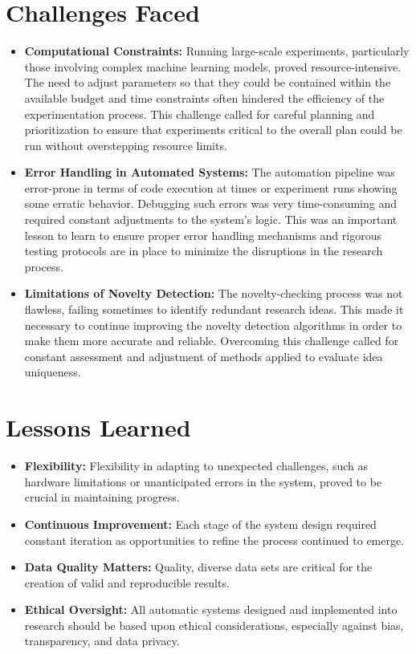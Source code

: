 \section{Challenges Faced}
\begin{itemize}
    \item \textbf{Computational Constraints:} Running large-scale experiments, particularly those involving complex machine learning models, proved resource-intensive. The need to adjust parameters so that they could be contained within the available budget and time constraints often hindered the efficiency of the experimentation process. This challenge called for careful planning and prioritization to ensure that experiments critical to the overall plan could be run without overstepping resource limits.
    
    \item \textbf{Error Handling in Automated Systems:} The automation pipeline was error-prone in terms of code execution at times or experiment runs showing some erratic behavior. Debugging such errors was very time-consuming and required constant adjustments to the system's logic. This was an important lesson to learn to ensure proper error handling mechanisms and rigorous testing protocols are in place to minimize the disruptions in the research process.
    
    \item \textbf{Limitations of Novelty Detection:} The novelty-checking process was not flawless, failing sometimes to identify redundant research ideas. This made it necessary to continue improving the novelty detection algorithms in order to make them more accurate and reliable. Overcoming this challenge called for constant assessment and adjustment of methods applied to evaluate idea uniqueness.
\end{itemize}

\section{Lessons Learned}
\begin{itemize}
    \item \textbf{Flexibility:} Flexibility in adapting to unexpected challenges, such as hardware limitations or unanticipated errors in the system, proved to be crucial in maintaining progress.

    \item \textbf{Continuous Improvement:} Each stage of the system design required constant iteration as opportunities to refine the process continued to emerge.

    \item \textbf{Data Quality Matters:} Quality, diverse data sets are critical for the creation of valid and reproducible results.

    \item \textbf{Ethical Oversight:} All automatic systems designed and implemented into research should be based upon ethical considerations, especially against bias, transparency, and data privacy.
\end{itemize}
